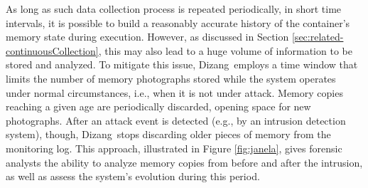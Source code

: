 \documentclass[conference]{IEEEtran}
\newcommand{\fancyname}{Dizang}
\begin{document}
As long as such data collection process is repeated periodically, in short time intervals, it is possible to build a reasonably accurate history of the container's memory state during execution.
%
However, as discussed in Section \ref{sec:related-continuousCollection}, this may also lead to a huge volume of information to be stored and analyzed.
%
%
%
To mitigate this issue, \fancyname\ employs a time window that limits the number of memory photographs stored while the system operates under normal circumstances, i.e., when it is not under attack.
%
Memory copies reaching a given age are periodically discarded, opening space for new photographs.
%
After an attack event is detected (e.g., by an intrusion detection system), though, \fancyname\ stops discarding older pieces of memory from the monitoring log.
%
This approach, illustrated in Figure \ref{fig:janela}, gives forensic analysts the ability to analyze memory copies from before and after the intrusion, as well as assess the system's evolution during this period.


%
%
\end{document}

